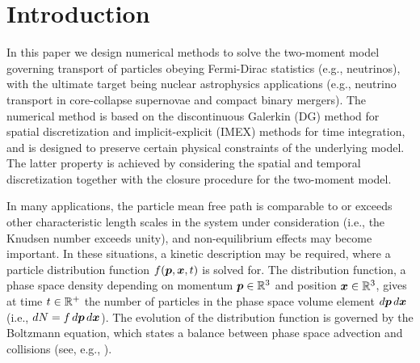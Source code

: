 \section{Introduction}
\label{sec:intro}

In this paper we design numerical methods to solve the two-moment model governing transport of particles obeying Fermi-Dirac statistics (e.g., neutrinos), with the ultimate target being nuclear astrophysics applications (e.g., neutrino transport in core-collapse supernovae and compact binary mergers).  
The numerical method is based on the discontinuous Galerkin (DG) method for spatial discretization and implicit-explicit (IMEX) methods for time integration, and is designed to preserve certain physical constraints of the underlying model.  
The latter property is achieved by considering the spatial and temporal discretization together with the closure procedure for the two-moment model.  

In many applications, the particle mean free path is comparable to or exceeds other characteristic length scales in the system under consideration (i.e., the Knudsen number exceeds unity), and non-equilibrium effects may become important.  
In these situations, a kinetic description may be required, where a particle distribution function $f(\boldsymbol{p},\boldsymbol{x},t)$ is solved for.  
The distribution function, a phase space density depending on momentum $\boldsymbol{p}\in\mathbb{R}^{3}$ and position $\boldsymbol{x}\in\mathbb{R}^{3}$, gives at time $t\in\mathbb{R}^{+}$ the number of particles in the phase space volume element $d\boldsymbol{p}\,d\boldsymbol{x}$ (i.e., $dN=f\,d\boldsymbol{p}\,d\boldsymbol{x}$).  
The evolution of the distribution function is governed by the Boltzmann equation, which states a balance between phase space advection and collisions (see, e.g., \cite{braginskii_1965,chapmanCowling_1970,lifshitzPitaevskii_1981}).  

